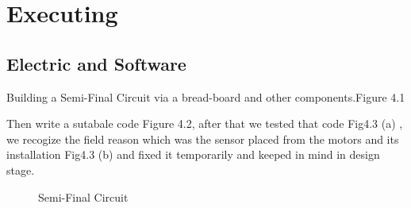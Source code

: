 \documentclass[11pt]{report}
\begin{document}
	
	\newpage
	\chapter{Executing}
	
	\section{Electric and Software}
	
		Building a Semi-Final Circuit via a bread-board and other components.Figure 4.1 
		
		Then write a sutabale code Figure 4.2, after that we tested that code Fig4.3 (a) , we recogize the field reason which was the sensor placed from the motors and its installation Fig4.3 (b) and fixed it temporarily and keeped in mind in design stage.
		
		
		
		
		\begin{figure}[b]
			\begin{center}
				\caption{Semi-Final Circuit}
			\end{center}
		\end{figure}
		
\end{document}
